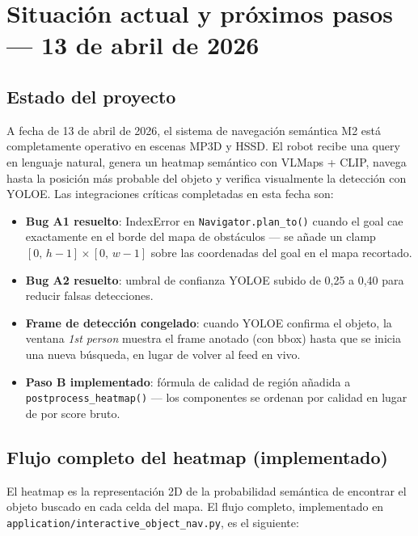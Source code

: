 \documentclass[11pt,a4paper]{article}
\begin{document}
\section{Situación actual y próximos pasos — 13 de abril de 2026}

\subsection{Estado del proyecto}

A fecha de 13 de abril de 2026, el sistema de navegación semántica M2 está completamente
operativo en escenas MP3D y HSSD. El robot recibe una query en lenguaje natural, genera un
heatmap semántico con VLMaps + CLIP, navega hasta la posición más probable del objeto y
verifica visualmente la detección con YOLOE. Las integraciones críticas completadas en esta
fecha son:

\begin{itemize}
  \item \textbf{Bug A1 resuelto}: IndexError en \texttt{Navigator.plan\_to()} cuando el goal
        cae exactamente en el borde del mapa de obstáculos --- se añade un clamp
        $[0,\,h{-}1]\times[0,\,w{-}1]$ sobre las coordenadas del goal en el mapa recortado.
  \item \textbf{Bug A2 resuelto}: umbral de confianza YOLOE subido de 0,25 a 0,40 para
        reducir falsas detecciones.
  \item \textbf{Frame de detección congelado}: cuando YOLOE confirma el objeto, la ventana
        \textit{1st person} muestra el frame anotado (con bbox) hasta que se inicia una nueva
        búsqueda, en lugar de volver al feed en vivo.
  \item \textbf{Paso B implementado}: fórmula de calidad de región añadida a
        \texttt{postprocess\_heatmap()} --- los componentes se ordenan por calidad en lugar
        de por score bruto.
\end{itemize}

\subsection{Flujo completo del heatmap (implementado)}

El heatmap es la representación 2D de la probabilidad semántica de encontrar el objeto
buscado en cada celda del mapa. El flujo completo, implementado en
\texttt{application/interactive\_object\_nav.py}, es el siguiente:
\end{document}
